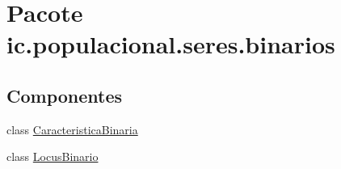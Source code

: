 \hypertarget{namespaceic_1_1populacional_1_1seres_1_1binarios}{\section{Pacote ic.\-populacional.\-seres.\-binarios}
\label{namespaceic_1_1populacional_1_1seres_1_1binarios}
}
\subsection*{Componentes}
\begin{DoxyCompactItemize}
\item 
class \hyperlink{classic_1_1populacional_1_1seres_1_1binarios_1_1_caracteristica_binaria}{Caracteristica\-Binaria}
\item 
class \hyperlink{classic_1_1populacional_1_1seres_1_1binarios_1_1_locus_binario}{Locus\-Binario}
\end{DoxyCompactItemize}
